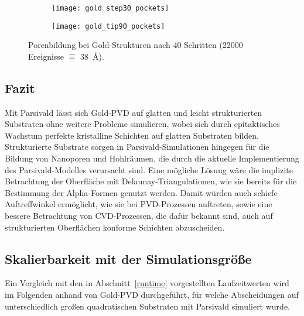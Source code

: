 \begin{figure}
  \captionsetup[subfigure]{singlelinecheck=false}
  \def\subfigwidth{0.49\textwidth}

  \begin{subfigure}[t]{\subfigwidth}
    \texttt{[image: gold\_step30\_pockets]}
    \label{fig:goldpockets-a}
  \end{subfigure}
  \hfill
  \begin{subfigure}[t]{\subfigwidth}
    \texttt{[image: gold\_tip90\_pockets]}
    \label{fig:goldpockets-b}
  \end{subfigure}

  \caption[Porenbildung bei Gold-Strukturen]{Porenbildung bei Gold-Strukturen nach 40 Schritten (\num{22000} Ereignisse $\hat{=}$ \SI{38}{\angstrom}).
  }
  \label{fig:goldpockets}
\end{figure}

\subsection{Fazit}

Mit Parsivald lässt sich Gold-PVD auf glatten und leicht strukturierten Substraten ohne weitere Probleme simulieren, wobei sich durch epitaktisches Wachstum perfekte kristalline Schichten auf glatten Substraten bilden.
Strukturierte Substrate sorgen in Parsivald-Simulationen hingegen für die Bildung von Nanoporen und Hohlräumen, die durch die aktuelle Implementierung des Parsivald-Modelles verursacht sind.
Eine mögliche Lösung wäre die implizite Betrachtung der Oberfläche mit Delaunay-Triangulationen, wie sie bereits für die Bestimmung der Alpha-Formen genutzt werden.
Damit würden auch schiefe Auftreffwinkel ermöglicht, wie sie bei PVD-Prozessen auftreten, sowie eine bessere Betrachtung von CVD-Prozessen, die dafür bekannt sind, auch auf strukturierten Oberflächen konforme Schichten abzuscheiden.

\subsection{Skalierbarkeit mit der Simulationsgröße}
\label{goldscalability}

Ein Vergleich mit den in Abschnitt~\ref{runtime} vorgestellten Laufzeitwerten wird im Folgenden anhand von Gold-PVD durchgeführt, für welche Abscheidungen auf unterschiedlich großen quadratischen Substraten mit Parsivald simuliert wurde.

